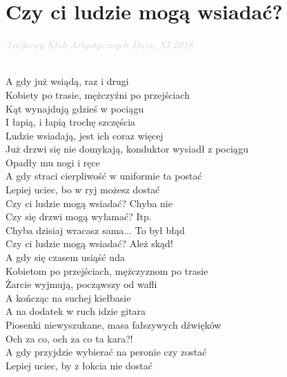 \documentclass[a5paper, 10pt]{book}
\begin{document}
\newpage
\section{Czy ci ludzie mogą wsiadać?}\textcolor{lightgray}{\textit{Trójkowy Klub Artystycznych Dusz, XI 2018}}\\~\\
\begin{minipage}[t]{0.8\textwidth}
  A gdy już wsiądą, raz i drugi \\
  Kobiety po trasie, mężczyźni po przejściach \\
  Kąt wynajdują gdzieś w pociągu \\
  I łapią, i łapią trochę szczęścia \vspace*{1.5mm}\\
  \hspace*{4mm}Ludzie wsiadają, jest ich coraz więcej \\
  \hspace*{4mm}Już drzwi się nie domykają, konduktor wysiadł z pociągu \\
  \hspace*{4mm}Opadły mu nogi i ręce\\
  \hspace*{4mm}A gdy straci cierpliwość w uniformie ta postać \\
  \hspace*{4mm}Lepiej uciec, bo w ryj możesz dostać \\

  \hspace*{7mm}Czy ci ludzie mogą wsiadać? Chyba nie \\
  \hspace*{7mm}Czy się drzwi mogą wyłamać? Itp. \\
  \hspace*{7mm}Chyba dzisiaj wracasz sama... To był błąd \\
  \hspace*{7mm}Czy ci ludzie mogą wsiadać? Ależ skąd! \\

  A gdy się czasem usiąść uda\\
  Kobietom po przejściach, mężczyznom po trasie\\
  Żarcie wyjmują, począwszy od wafli\\
  A kończąc na suchej kiełbasie\vspace*{1.5mm}\\
  \hspace*{4mm}A na dodatek w ruch idzie gitara\\
  \hspace*{4mm}Piosenki niewyszukane, masa fałszywych dźwięków\\
  \hspace*{4mm}Och za co, och za co ta kara?!\\
  \hspace*{4mm}A gdy przyjdzie wybierać na peronie czy zostać\\
  \hspace*{4mm}Lepiej uciec, by z łokcia nie dostać\\


\end{minipage}
\end{document}
